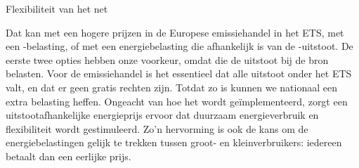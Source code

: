 \begin{voorstel}{Flexibiliteit van het net}
\begin{multicols*}{2}
\begin{aanbevelingen}
 Dat kan met een hogere prijzen in de Europese emissiehandel in het ETS, met een \COO-belasting, of met een energiebelasting die afhankelijk is van de \COO-uitstoot. De eerste twee opties hebben onze voorkeur, omdat die de uitstoot bij de bron belasten. Voor de emissiehandel is het essentieel dat alle uitstoot onder het ETS valt, en dat er geen gratis rechten zijn. Totdat zo is kunnen we nationaal een extra belasting heffen. Ongeacht van hoe het wordt geïmplementeerd, zorgt een uitstootafhankelijke energieprijs ervoor dat duurzaam energieverbruik en flexibiliteit wordt gestimuleerd. Zo'n hervorming is ook de kans om de energiebelastingen gelijk te trekken tussen groot- en kleinverbruikers: iedereen betaalt dan een eerlijke prijs.
\end{aanbevelingen}

\end{multicols*}

\end{voorstel}
